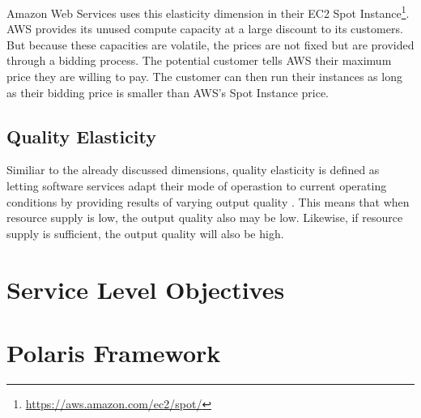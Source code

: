 Amazon Web Services uses this elasticity dimension in their EC2 Spot Instance\footnote{\url{https://aws.amazon.com/ec2/spot/}}. AWS provides its unused compute capacity at a large discount to its customers. But because these capacities are volatile, the prices are not fixed but are provided through a bidding process. The potential customer tells AWS their maximum price they are willing to pay. The customer can then run their instances as long as their bidding price is smaller than AWS's Spot Instance price.

\subsection{Quality Elasticity}

Similiar to the already discussed dimensions, quality elasticity is defined as letting software services adapt their mode of operastion to current operating conditions by providing results of varying output quality \cite{larssonQualityElasticityImprovedResource2019}. This means that when resource supply is low, the output quality also may be low. Likewise, if resource supply is sufficient, the output quality will also be high.

\section{Service Level Objectives}

\section{Polaris Framework}


